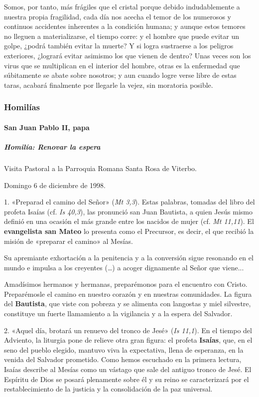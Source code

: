 \documentclass[]{article}
\let\oldparagraph\paragraph
\renewcommand{\paragraph}[1]{\oldparagraph{#1}\mbox{}}
\let\oldsubparagraph\subparagraph
\renewcommand{\subparagraph}[1]{\oldsubparagraph{#1}\mbox{}}
\begin{document}
Somos, por tanto, más frágiles que el cristal porque debido
indudablemente a nuestra propia fragilidad, cada día nos acecha el temor
de los numerosos y continuos accidentes inherentes a la condición
humana; y aunque estos temores no lleguen a materializarse, el tiempo
corre: y el hombre que puede evitar un golpe, ¿podrá también evitar la
muerte? Y si logra sustraerse a los peligros exteriores, ¿logrará evitar
asimismo los que vienen de dentro? Unas veces son los virus que se
multiplican en el interior del hombre, otras es la enfermedad que
súbitamente se abate sobre nosotros; y aun cuando logre verse libre de
estas taras, acabará finalmente por llegarle la vejez, sin moratoria
posible.

\subsubsection{Homilías}\label{homiluxedas-1}

\paragraph{San Juan Pablo II, papa}\label{san-juan-pablo-ii-papa-1}

\subparagraph{Homilía: Renovar la
espera}\label{homiluxeda-renovar-la-espera}

Visita Pastoral a la Parroquia Romana Santa Rosa de Viterbo. 

Domingo 6 de diciembre de 1998.

1. «Preparad el camino del Señor» (\emph{Mt 3,3}). Estas palabras,
tomadas del libro del profeta Isaías (cf. \emph{Is 40,3}), las pronunció
san Juan Bautista, a quien Jesús mismo definió en una ocasión el más
grande entre los nacidos de mujer (cf. \emph{Mt 11,11}). El
\textbf{evangelista san Mateo} lo presenta como el Precursor, es decir,
el que recibió la misión de «preparar el camino» al Mesías.

Su apremiante exhortación a la penitencia y a la conversión sigue
resonando en el mundo e impulsa a los creyentes (\ldots{}) a acoger
dignamente al Señor que viene...

Amadísimos hermanos y hermanas, preparémonos para el encuentro con
Cristo. Preparémosle el camino en nuestro corazón y en nuestras
comunidades. La figura del \textbf{Bautista}, que viste con pobreza y se
alimenta con langostas y miel silvestre, constituye un fuerte
llamamiento a la vigilancia y a la espera del Salvador.

2. «Aquel día, brotará un renuevo del tronco de Jesé» (\emph{Is 11,1}).
En el tiempo del Adviento, la liturgia pone de relieve otra gran figura:
el profeta \textbf{Isaías}, que, en el seno del pueblo elegido, mantuvo
viva la expectativa, llena de esperanza, en la venida del Salvador
prometido. Como hemos escuchado en la primera lectura, Isaías describe
al Mesías como un vástago que sale del antiguo tronco de Jesé. El
Espíritu de Dios se posará plenamente sobre él y su reino se
caracterizará por el restablecimiento de la justicia y la consolidación
de la paz universal.
\end{document}
